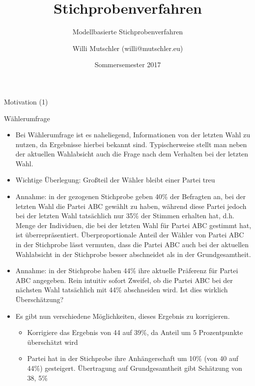 \documentclass[9pt]{beamer}
\title{Stichprobenverfahren}
\subtitle{Modellbasierte Stichprobenverfahren}
\date[SS2017]{Sommersemester 2017}
\author{Willi Mutschler (willi@mutschler.eu)}
\begin{document}
\maketitle

\begin{frame}{Motivation (1)}\small
\begin{block}{Wählerumfrage}
	\begin{itemize}
\item Bei Wählerumfrage ist es naheliegend, Informationen von
der letzten Wahl zu nutzen, da Ergebnisse hierbei bekannt sind. Typischerweise stellt man neben der aktuellen Wahlabsicht auch die Frage nach dem Verhalten bei der letzten Wahl.
\item Wichtige Überlegung: Großteil der Wähler bleibt einer Partei treu
\item Annahme: in der gezogenen Stichprobe geben 40\% der Befragten an, bei der letzten Wahl die Partei ABC gewählt zu
haben, während diese Partei jedoch bei der letzten Wahl tatsächlich nur 35\% der Stimmen erhalten hat, d.h. Menge der Individuen, die bei der letzten Wahl für Partei ABC gestimmt hat, ist überrepräsentiert. Überproportionale Anteil der Wähler von Partei ABC in der Stichprobe lässt vermuten, dass die Partei ABC auch bei der aktuellen Wahlabsicht in der Stichprobe besser abschneidet als in der Grundgesamtheit.
\item Annahme: in der Stichprobe haben 44\% ihre aktuelle Präferenz für Partei ABC angegeben. Rein intuitiv sofort Zweifel, ob die Partei ABC bei der nächsten Wahl tatsächlich mit 44\% abschneiden wird. Ist dies wirklich Überschätzung?
\item Es gibt nun verschiedene Möglichkeiten, dieses Ergebnis zu korrigieren. 
\begin{itemize}
\item Korrigiere das Ergebnis von 44 auf 39\%, da Anteil um 5 Prozentpunkte überschätzt wird 
\item Partei hat in der Stichprobe ihre Anhängerschaft um 10\% (von 40 auf 44\%) gesteigert. Übertragung auf 
Grundgesamtheit gibt Schätzung von 38, 5\%
\end{itemize}
\end{itemize}
\end{block}
\end{frame}
\end{document}
